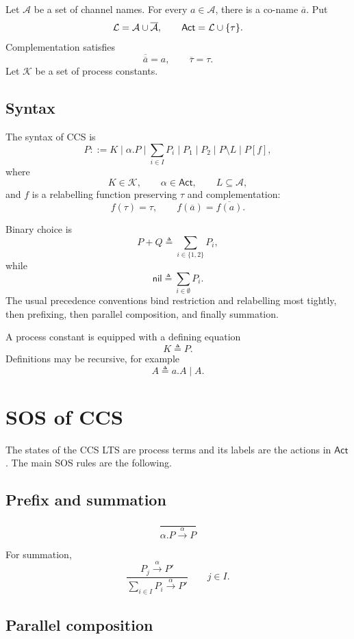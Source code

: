 \documentclass[a4paper]{article}
\newcommand{\Act}{\mathsf{Act}}
\newcommand{\nil}{\mathsf{nil}}
\newcommand{\trans}[1]{\xrightarrow{#1}}
\begin{document}
Let \(\mathcal A\) be a set of channel names.
For every \(a\in\mathcal A\), there is a co-name \(\overline a\).
Put
\[
    \mathcal L
    =
    \mathcal A\union\overline{\mathcal A},
    \qquad
    \Act
    =
    \mathcal L\union\{\tau\}.
\]
Complementation satisfies
\[
    \overline{\overline a}=a,
    \qquad
    \overline\tau=\tau.
\]
Let \(\mathcal K\) be a set of process constants.

\subsection{Syntax}

The syntax of CCS is
\[
    P
    ::=K
    \mid \alpha.P
    \mid \sum_{i\in I}P_i
    \mid P_1\mid P_2
    \mid P\setminus L
    \mid P[f],
\]
where
\[
    K\in\mathcal K,
    \qquad
    \alpha\in\Act,
    \qquad
    L\subseteq\mathcal A,
\]
and \(f\) is a relabelling function preserving \(\tau\) and complementation:
\[
    f(\tau)=\tau,
    \qquad
    f(\overline a)=\overline{f(a)}.
\]

Binary choice is
\[
    P+Q
    \triangleq
    \sum_{i\in\{1,2\}}P_i,
\]
while
\[
    \nil
    \triangleq
    \sum_{i\in\emptyset}P_i.
\]
The usual precedence conventions bind restriction and relabelling most tightly, then prefixing, then parallel composition, and finally summation.

A process constant is equipped with a defining equation
\[
    K\triangleq P.
\]
Definitions may be recursive, for example
\[
    A\triangleq a.A\mid A.
\]

\section{SOS of CCS}

The states of the CCS LTS are process terms and its labels are the actions in \(\Act\).
The main SOS rules are the following.

\subsection{Prefix and summation}

\[
    \frac{}{\alpha.P\trans{\alpha}P}
    \tag{ACT}
\]

For summation,
\[
    \frac{P_j\trans{\alpha}P'}
    {\sum_{i\in I}P_i\trans{\alpha}P'}
    \qquad j\in I.
    \tag{SUM}
\]

\subsection{Parallel composition}
\end{document}
